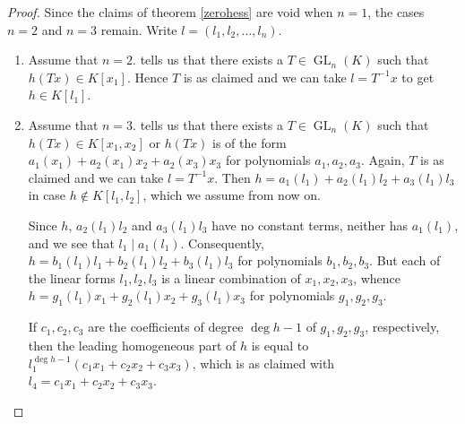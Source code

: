 \documentclass[10pt]{article}
\theoremstyle{remark}
\theoremstyle{definition}
\newcommand{\GL}{\operatorname{GL}}
\begin{document}
\begin{proof}
Since the claims of theorem \ref{zerohess} are void when $n = 1$, the cases $n = 2$ and $n = 3$ remain. 
Write $l = (l_1, l_2, \ldots, l_n)$.
\begin{enumerate}

\item[i)] Assume that $n = 2$. \cite[Th.\@ 3.1]{MR2095579} tells us that there exists a 
$T \in \GL_n(K)$ such that $h(Tx) \in K[x_1]$. Hence $T$ is as claimed and we can take 
$l = T^{-1} x$ to get $h \in K[l_1]$.

\item[ii)] Assume that $n = 3$. \cite[Th.\@ 3.3]{MR2095579} tells us that there exists a 
$T \in \GL_n(K)$ such that $h(Tx) \in K[x_1,x_2]$ or $h(Tx)$ is of the form 
$a_1(x_1) + a_2(x_1) x_2 + a_2(x_3) x_3$ for polynomials $a_1, a_2, a_3$. Again, $T$ is as 
claimed and we can take $l = T^{-1} x$. Then $h = a_1(l_1) + a_2(l_1) l_2 + a_3(l_1)l_3$ in case 
$h \notin K[l_1,l_2]$, which we assume from now on.

Since $h$, $a_2(l_1) l_2$ and $a_3(l_1)l_3$ have 
no constant terms, neither has $a_1(l_1)$, and we see that $l_1 \mid a_1(l_1)$. Consequently,
$h = b_1(l_1)l_1 + b_2(l_1) l_2 + b_3(l_1)l_3$ for polynomials $b_1, b_2, b_3$.
But each of the linear forms $l_1, l_2, l_3$ is a linear combination of $x_1, x_2, x_3$, 
whence $h = g_1(l_1) x_1 + g_2(l_1) x_2 + g_3(l_1)x_3$ for polynomials $g_1, g_2, g_3$.

If $c_1, c_2, c_3$ are the coefficients of degree $\deg h - 1$ of $g_1, g_2, g_3$, respectively,
then the leading homogeneous part of $h$ is equal to $l_1^{\deg h-1} (c_1 x_1 + c_2 x_2 + c_3 x_3)$,
which is as claimed with $l_4 = c_1 x_1 + c_2 x_2 + c_3 x_3$. \qedhere

\end{enumerate}
\end{proof}
\end{document}
